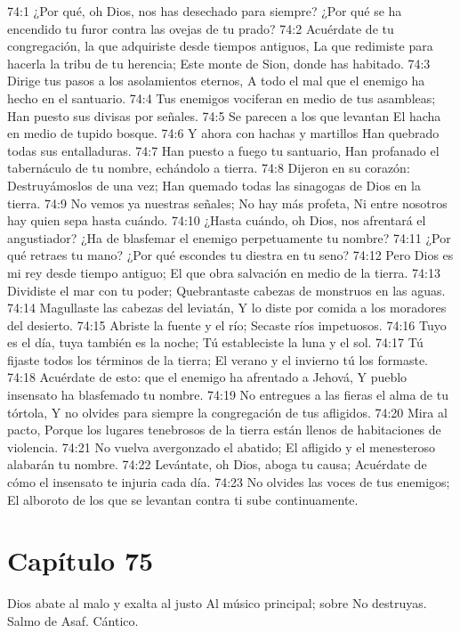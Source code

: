 74:1 ¿Por qué, oh Dios, nos has desechado para siempre? 
¿Por qué se ha encendido tu furor contra las ovejas de tu prado? 
74:2 Acuérdate de tu congregación, la que adquiriste desde tiempos antiguos, 
La que redimiste para hacerla la tribu de tu herencia; 
Este monte de Sion, donde has habitado. 
74:3 Dirige tus pasos a los asolamientos eternos, 
A todo el mal que el enemigo ha hecho en el santuario. 
74:4 Tus enemigos vociferan en medio de tus asambleas; 
Han puesto sus divisas por señales. 
74:5 Se parecen a los que levantan 
El hacha en medio de tupido bosque. 
74:6 Y ahora con hachas y martillos 
Han quebrado todas sus entalladuras. 
74:7 Han puesto a fuego tu santuario, 
Han profanado el tabernáculo de tu nombre, echándolo a tierra. 
74:8 Dijeron en su corazón: Destruyámoslos de una vez; 
Han quemado todas las sinagogas de Dios en la tierra. 
74:9 No vemos ya nuestras señales; 
No hay más profeta, 
Ni entre nosotros hay quien sepa hasta cuándo. 
74:10 ¿Hasta cuándo, oh Dios, nos afrentará el angustiador? 
¿Ha de blasfemar el enemigo perpetuamente tu nombre? 
74:11 ¿Por qué retraes tu mano? 
¿Por qué escondes tu diestra en tu seno? 
74:12 Pero Dios es mi rey desde tiempo antiguo; 
El que obra salvación en medio de la tierra. 
74:13 Dividiste el mar con tu poder; 
Quebrantaste cabezas de monstruos en las aguas. 
74:14 Magullaste las cabezas del leviatán, 
Y lo diste por comida a los moradores del desierto. 
74:15 Abriste la fuente y el río; 
Secaste ríos impetuosos. 
74:16 Tuyo es el día, tuya también es la noche; 
Tú estableciste la luna y el sol. 
74:17 Tú fijaste todos los términos de la tierra; 
El verano y el invierno tú los formaste. 
74:18 Acuérdate de esto: que el enemigo ha afrentado a Jehová, 
Y pueblo insensato ha blasfemado tu nombre. 
74:19 No entregues a las fieras el alma de tu tórtola, 
Y no olvides para siempre la congregación de tus afligidos. 
74:20 Mira al pacto, 
Porque los lugares tenebrosos de la tierra están llenos de habitaciones de violencia. 
74:21 No vuelva avergonzado el abatido; 
El afligido y el menesteroso alabarán tu nombre. 
74:22 Levántate, oh Dios, aboga tu causa; 
Acuérdate de cómo el insensato te injuria cada día. 
74:23 No olvides las voces de tus enemigos; 
El alboroto de los que se levantan contra ti sube continuamente. 
\section*{Capítulo 75}
Dios abate al malo y exalta al justo 
Al músico principal; sobre No destruyas. Salmo de Asaf. Cántico. 
 
